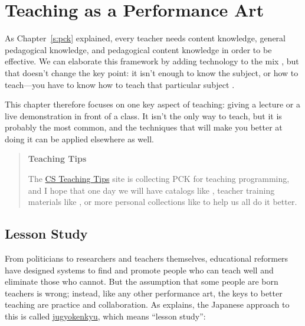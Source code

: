 \chapter{Teaching as a Performance Art}\label{s:performance}

As Chapter~\ref{s:pck} explained, every teacher needs content knowledge,
general pedagogical knowledge, and pedagogical content knowledge in
order to be effective. We can elaborate this framework by adding
technology to the mix \cite{Koeh2013}, but that doesn't change the
key point: it isn't enough to know the subject, or how to teach---you have
to know how to teach that particular subject \cite{Maye2004}.

This chapter therefore focuses on one key aspect of teaching: giving a
lecture or a live demonstration in front of a class. It isn't the only
way to teach, but it is probably the most common, and the techniques
that will make you better at doing it can be applied elsewhere as well.

\begin{quote}\setlength{\parindent}{0pt}
\textbf{Teaching Tips}

The \href{http://csteachingtips.org/}{CS Teaching Tips} site is collecting PCK for
teaching programming, and I hope that one day we will have catalogs
like \cite{Ojos2015}, teacher training materials like
\cite{Hazz2014,Guzd2015a,Sent2018}, or more
personal collections like \cite{Gelm2002} to help us all do it
better.
\end{quote}

\section{Lesson Study}\label{s:performance-jugyokenkyu}

From politicians to researchers and teachers themselves, educational
reformers have designed systems to find and promote people who can teach
well and eliminate those who cannot. But the assumption that some people
are born teachers is wrong; instead, like any other performance art, the
keys to better teaching are practice and collaboration. As
\cite{Gree2014} explains, the Japanese approach to this is called
\protect\hyperlink{g:jugyokenkyu}{jugyokenkyu}, which means ``lesson study'':

